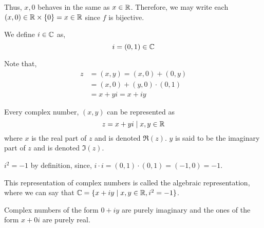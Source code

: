 Thus, \(x, 0\) behaves in the same as \(x \in \mathbb R\). Therefore, we may write each \((x, 0) \in 
\mathbb R \times \{0\} = x \in \mathbb R\) since \(f\) is bijective.

\begin{definition}
    We define \(i \in \mathbb C\) as, 
    \[i = (0, 1) \in \mathbb C\]
\end{definition}

Note that, 
\begin{align*}
    z &= (x, y) = (x, 0) + (0, y)  \\ 
    &= (x, 0) + (y, 0) \cdot (0,1) \\
    &= x + yi = x + iy
\end{align*}

\begin{lemma}
    Every complex number, \((x, y)\) can be represented as 
    \[
        z = x + yi \mid x, y \in \mathbb R\]
    where \(x\) is the real part of \(z\) and is denoted \(\Re(z)\). \(y\) is said
    to be the imaginary part of \(z\) and is denoted \(\Im(z)\).
\end{lemma}

\(i^2 = -1\) by definition, since, \(i \cdot i = (0,1) \cdot (0,1) = (-1,0) = -1\).

This representation of complex numbers is called the algebraic representation, where we can
say that \(\mathbb C = \{x + iy \mid x, y \in \mathbb R, i^2 = -1\}\). 

Complex numbers of the form \(0 + iy\) are purely imaginary and the ones of the form \(x + 0i\)
are purely real. 

